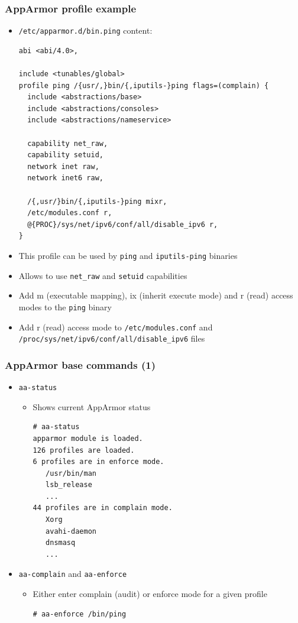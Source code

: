 \begin{frame}[fragile]
	\frametitle{AppArmor profile example}
	\begin{itemize}
		\item \texttt{/etc/apparmor.d/bin.ping} content:
			\begin{block}{}
				{\tiny
				\begin{verbatim}
abi <abi/4.0>,

include <tunables/global>
profile ping /{usr/,}bin/{,iputils-}ping flags=(complain) {
  include <abstractions/base>
  include <abstractions/consoles>
  include <abstractions/nameservice>

  capability net_raw,
  capability setuid,
  network inet raw,
  network inet6 raw,

  /{,usr/}bin/{,iputils-}ping mixr,
  /etc/modules.conf r,
  @{PROC}/sys/net/ipv6/conf/all/disable_ipv6 r,
}
\end{verbatim}
}
			\end{block}
		\item This profile can be used by \texttt{ping} and \texttt{iputils-ping}
			binaries
		\item Allows to use \texttt{net\_raw} and \texttt{setuid} capabilities
		\item Add m (executable mapping), ix (inherit execute mode) and r (read)
			access modes to the \texttt{ping} binary
		\item Add r (read) access mode to \texttt{/etc/modules.conf} and
			\texttt{/proc/sys/net/ipv6/conf/all/disable\_ipv6} files
	\end{itemize}
\end{frame}

\begin{frame}[fragile]
	\frametitle{AppArmor base commands (1)}
	\begin{itemize}
		\item \texttt{aa-status}
			\begin{itemize}
				\item Shows current AppArmor status
			\begin{block}{}
				{\tiny
				\begin{verbatim}
# aa-status
apparmor module is loaded.
126 profiles are loaded.
6 profiles are in enforce mode.
   /usr/bin/man
   lsb_release
   ...
44 profiles are in complain mode.
   Xorg
   avahi-daemon
   dnsmasq
   ...
\end{verbatim}
}
			\end{block}
			\end{itemize}
		\item \texttt{aa-complain} and \texttt{aa-enforce}
			\begin{itemize}
				\item Either enter complain (audit) or enforce mode for a given profile
			\begin{block}{}
				{\tiny
				\begin{verbatim}
# aa-enforce /bin/ping
\end{verbatim}
}
			\end{block}
			\end{itemize}
	\end{itemize}
\end{frame}

